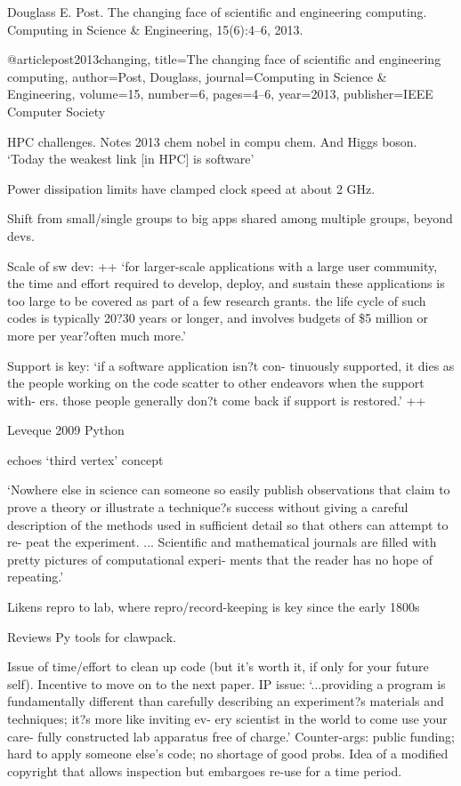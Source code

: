 \documentclass[12pt]{amsart}
\begin{document}
Douglass E. Post. The changing face of scientific and engineering computing. Computing in Science \& Engineering, 15(6):4--6, 2013.

@article{post2013changing,
  title={The changing face of scientific and engineering computing},
  author={Post, Douglass},
  journal={Computing in Science \& Engineering},
  volume={15},
  number={6},
  pages={4--6},
  year={2013},
  publisher={IEEE Computer Society}
}

HPC challenges. Notes 2013 chem nobel in compu chem. And Higgs boson. `Today the weakest link [in HPC] is software'

Power dissipation limits have clamped clock speed at about 2 GHz. 

Shift from small/single groups to big apps shared among multiple groups, beyond devs.

Scale of sw dev: ++ `for larger-scale applications with a large user community, the time and effort required to develop, deploy, and sustain these applications is too large to be covered as part of a few research grants. the life cycle of such codes is typically 20?30 years or longer, and involves budgets of \$5 million or more per year?often much more.'

Support is key: `if a software application isn?t con- tinuously supported, it dies as the people working on the code scatter to other endeavors when the support with- ers. those people generally don?t come back if support is restored.' ++


Leveque 2009 Python

echoes `third vertex' concept

`Nowhere else in science can someone so easily publish observations that claim to prove a theory or illustrate a technique?s success without giving a careful description of the methods used in sufficient detail so that others can attempt to re- peat the experiment. ... Scientific and mathematical journals are filled with pretty pictures of computational experi- ments that the reader has no hope of repeating.'

Likens repro to lab, where repro/record-keeping is key since the early 1800s

Reviews Py tools for clawpack. 

Issue of time/effort to clean up code (but it's worth it, if only for your future self). Incentive to move on to the next paper. IP issue: `...providing a program is fundamentally different than carefully describing an experiment?s materials and techniques; it?s more like inviting ev- ery scientist in the world to come use your care- fully constructed lab apparatus free of charge.' Counter-args: public funding; hard to apply someone else's code; no shortage of good probs. Idea of a modified copyright that allows inspection but embargoes re-use for a time period.
\end{document}
